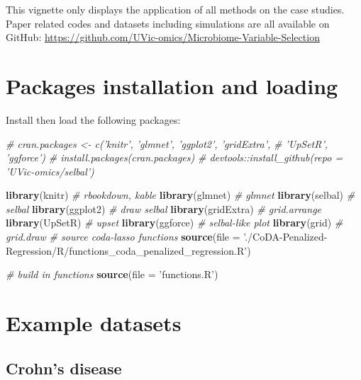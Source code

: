 \documentclass[openany]{book}
\newenvironment{Shaded}{\begin{snugshade}}{\end{snugshade}}
\newcommand{\KeywordTok}[1]{\textcolor[rgb]{0.13,0.29,0.53}{\textbf{#1}}}
\newcommand{\DataTypeTok}[1]{\textcolor[rgb]{0.13,0.29,0.53}{#1}}
\newcommand{\StringTok}[1]{\textcolor[rgb]{0.31,0.60,0.02}{#1}}
\newcommand{\CommentTok}[1]{\textcolor[rgb]{0.56,0.35,0.01}{\textit{#1}}}
\newcommand{\NormalTok}[1]{#1}
\begin{document}
This vignette only displays the application of all methods on the case
studies. Paper related codes and datasets including simulations are all
available on GitHub:
\url{https://github.com/UVic-omics/Microbiome-Variable-Selection}

\section{Packages installation and
loading}\label{packages-installation-and-loading}

Install then load the following packages:

\begin{Shaded}
\begin{Highlighting}[]
\CommentTok{# cran.packages <- c('knitr', 'glmnet', 'ggplot2', 'gridExtra',}
\CommentTok{#                    'UpSetR', 'ggforce')}
\CommentTok{# install.packages(cran.packages)}
\CommentTok{# devtools::install_github(repo = 'UVic-omics/selbal')}

\KeywordTok{library}\NormalTok{(knitr) }\CommentTok{# rbookdown, kable}
\KeywordTok{library}\NormalTok{(glmnet) }\CommentTok{# glmnet}
\KeywordTok{library}\NormalTok{(selbal) }\CommentTok{# selbal}
\KeywordTok{library}\NormalTok{(ggplot2) }\CommentTok{# draw selbal}
\KeywordTok{library}\NormalTok{(gridExtra) }\CommentTok{# grid.arrange}
\KeywordTok{library}\NormalTok{(UpSetR) }\CommentTok{# upset}
\KeywordTok{library}\NormalTok{(ggforce) }\CommentTok{# selbal-like plot}
\KeywordTok{library}\NormalTok{(grid) }\CommentTok{# grid.draw}
\CommentTok{# source coda-lasso functions}
\KeywordTok{source}\NormalTok{(}\DataTypeTok{file =} \StringTok{'./CoDA-Penalized-Regression/R/functions_coda_penalized_regression.R'}\NormalTok{)}

\CommentTok{# build in functions}
\KeywordTok{source}\NormalTok{(}\DataTypeTok{file =} \StringTok{'functions.R'}\NormalTok{)}
\end{Highlighting}
\end{Shaded}

\section{Example datasets}\label{example-datasets}

\subsection{Crohn's disease}\label{crohns-disease}
\end{document}
